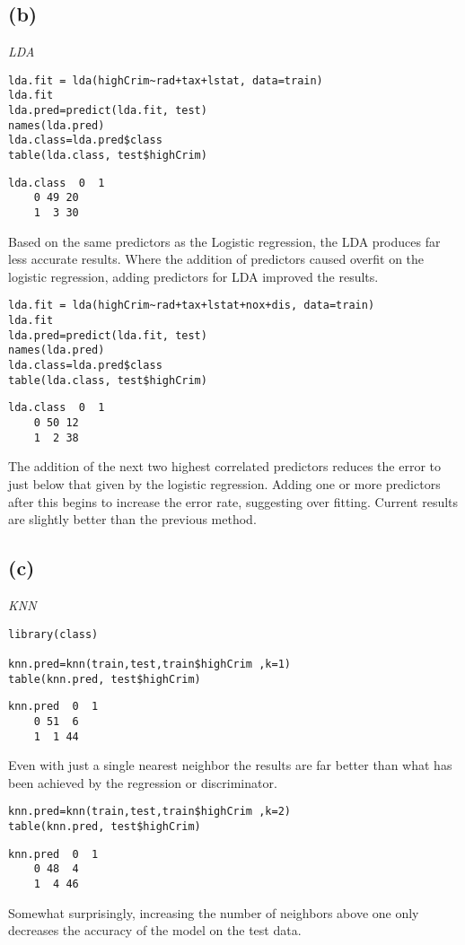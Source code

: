 \documentclass[a4paper,man,natbib]{apa6}
\begin{document}
\clearpage
\subsection{(b)}
\emph{LDA}
\begin{verbatim}
lda.fit = lda(highCrim~rad+tax+lstat, data=train)
lda.fit
lda.pred=predict(lda.fit, test)
names(lda.pred)
lda.class=lda.pred$class
table(lda.class, test$highCrim)
\end{verbatim}

\begin{verbatim}
lda.class  0  1
	0 49 20
	1  3 30
\end{verbatim}

Based on the same predictors as the Logistic regression, the LDA produces far less accurate results. Where the addition of predictors caused overfit on the logistic regression, adding predictors for LDA improved the results.

\begin{verbatim}
lda.fit = lda(highCrim~rad+tax+lstat+nox+dis, data=train)
lda.fit
lda.pred=predict(lda.fit, test)
names(lda.pred)
lda.class=lda.pred$class
table(lda.class, test$highCrim)
\end{verbatim}

\begin{verbatim}
lda.class  0  1
	0 50 12
	1  2 38
\end{verbatim}

The addition of the next two highest correlated predictors reduces the error to just below that given by the logistic regression. Adding one or more predictors after this begins to increase the error rate, suggesting over fitting. Current results are slightly better than the previous method.

\clearpage
\subsection{(c)}
\emph{KNN}
\begin{verbatim}
library(class)

knn.pred=knn(train,test,train$highCrim ,k=1)
table(knn.pred, test$highCrim)
\end{verbatim}

\begin{verbatim}
knn.pred  0  1
	0 51  6
	1  1 44
\end{verbatim}

Even with just a single nearest neighbor the results are far better than what has been achieved by the regression or discriminator. 

\begin{verbatim}
knn.pred=knn(train,test,train$highCrim ,k=2)
table(knn.pred, test$highCrim)
\end{verbatim}

\begin{verbatim}
knn.pred  0  1
	0 48  4
	1  4 46
\end{verbatim}

Somewhat surprisingly, increasing the number of neighbors above one only decreases the accuracy of the model on the test data.  
	
\end{document}
